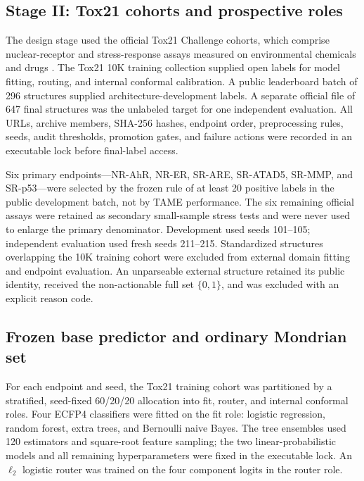 \subsection{Stage II: Tox21 cohorts and prospective roles}
\label{sec:methods_tox21}

The design stage used the official Tox21 Challenge cohorts, which comprise nuclear-receptor and stress-response assays measured on environmental chemicals and drugs \citep{huang2016tox21challenge}. The Tox21 10K training collection supplied open labels for model fitting, routing, and internal conformal calibration. A public leaderboard batch of 296 structures supplied architecture-development labels. A separate official file of 647 final structures was the unlabeled target for one independent evaluation. All URLs, archive members, SHA-256 hashes, endpoint order, preprocessing rules, seeds, audit thresholds, promotion gates, and failure actions were recorded in an executable lock before final-label access.

Six primary endpoints---NR-AhR, NR-ER, SR-ARE, SR-ATAD5, SR-MMP, and SR-p53---were selected by the frozen rule of at least 20 positive labels in the public development batch, not by TAME performance. The six remaining official assays were retained as secondary small-sample stress tests and were never used to enlarge the primary denominator. Development used seeds 101--105; independent evaluation used fresh seeds 211--215. Standardized structures overlapping the 10K training cohort were excluded from external domain fitting and endpoint evaluation. An unparseable external structure retained its public identity, received the non-actionable full set $\{0,1\}$, and was excluded with an explicit reason code.

\subsection{Frozen base predictor and ordinary Mondrian set}

For each endpoint and seed, the Tox21 training cohort was partitioned by a stratified, seed-fixed 60/20/20 allocation into fit, router, and internal conformal roles. Four ECFP4 classifiers were fitted on the fit role: logistic regression, random forest, extra trees, and Bernoulli naive Bayes. The tree ensembles used 120 estimators and square-root feature sampling; the two linear-probabilistic models and all remaining hyperparameters were fixed in the executable lock. An $\ell_2$ logistic router was trained on the four component logits in the router role.

